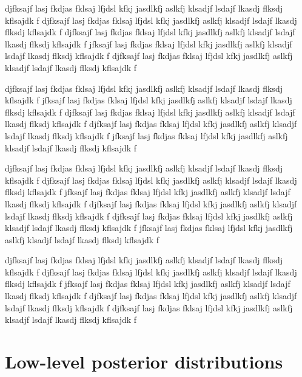 \documentclass[twocolumn]{../../common/aa}
\begin{document}

djfksajf lasj fkdjas fklsaj lfjdsl kfkj jasdlkfj aslkfj klsadjf lsdajf lkasdj flksdj kflsajdk f
djfksajf lasj fkdjas fklsaj lfjdsl kfkj jasdlkfj aslkfj klsadjf lsdajf lkasdj flksdj kflsajdk f
djfksajf lasj fkdjas fklsaj lfjdsl kfkj jasdlkfj aslkfj klsadjf lsdajf lkasdj flksdj kflsajdk f
jfksajf lasj fkdjas fklsaj lfjdsl kfkj jasdlkfj aslkfj klsadjf lsdajf lkasdj flksdj kflsajdk f
djfksajf lasj fkdjas fklsaj lfjdsl kfkj jasdlkfj aslkfj klsadjf lsdajf lkasdj flksdj kflsajdk f

djfksajf lasj fkdjas fklsaj lfjdsl kfkj jasdlkfj aslkfj klsadjf lsdajf lkasdj flksdj kflsajdk f
jfksajf lasj fkdjas fklsaj lfjdsl kfkj jasdlkfj aslkfj klsadjf lsdajf lkasdj flksdj kflsajdk f
djfksajf lasj fkdjas fklsaj lfjdsl kfkj jasdlkfj aslkfj klsadjf lsdajf lkasdj flksdj kflsajdk f
djfksajf lasj fkdjas fklsaj lfjdsl kfkj jasdlkfj aslkfj klsadjf lsdajf lkasdj flksdj kflsajdk f
jfksajf lasj fkdjas fklsaj lfjdsl kfkj jasdlkfj aslkfj klsadjf lsdajf lkasdj flksdj kflsajdk f

djfksajf lasj fkdjas fklsaj lfjdsl kfkj jasdlkfj aslkfj klsadjf lsdajf lkasdj flksdj kflsajdk f
djfksajf lasj fkdjas fklsaj lfjdsl kfkj jasdlkfj aslkfj klsadjf lsdajf lkasdj flksdj kflsajdk f
jfksajf lasj fkdjas fklsaj lfjdsl kfkj jasdlkfj aslkfj klsadjf lsdajf lkasdj flksdj kflsajdk f
djfksajf lasj fkdjas fklsaj lfjdsl kfkj jasdlkfj aslkfj klsadjf lsdajf lkasdj flksdj kflsajdk f
djfksajf lasj fkdjas fklsaj lfjdsl kfkj jasdlkfj aslkfj klsadjf lsdajf lkasdj flksdj kflsajdk f
jfksajf lasj fkdjas fklsaj lfjdsl kfkj jasdlkfj aslkfj klsadjf lsdajf lkasdj flksdj kflsajdk f

djfksajf lasj fkdjas fklsaj lfjdsl kfkj jasdlkfj aslkfj klsadjf lsdajf lkasdj flksdj kflsajdk f
djfksajf lasj fkdjas fklsaj lfjdsl kfkj jasdlkfj aslkfj klsadjf lsdajf lkasdj flksdj kflsajdk f
jfksajf lasj fkdjas fklsaj lfjdsl kfkj jasdlkfj aslkfj klsadjf lsdajf lkasdj flksdj kflsajdk f
djfksajf lasj fkdjas fklsaj lfjdsl kfkj jasdlkfj aslkfj klsadjf lsdajf lkasdj flksdj kflsajdk f
djfksajf lasj fkdjas fklsaj lfjdsl kfkj jasdlkfj aslkfj klsadjf lsdajf lkasdj flksdj kflsajdk f

\clearpage
\section{Low-level posterior distributions}
\label{sec:lowlevel}
\end{document}
